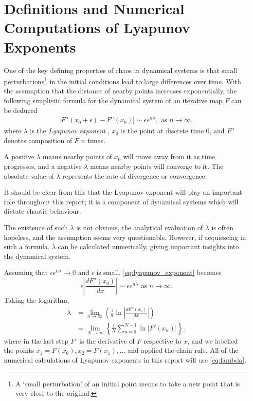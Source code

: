\section{Definitions and Numerical Computations of Lyapunov Exponents}

One of the key defining properties of chaos in dynamical systems is that small perturbations\footnote{A `small perturbation' of an initial point means to take a new point that is very close to the original.} in the initial conditions lead to large differences over time.
With the assumption that the distance of nearby points increases exponentially, the following simplistic formula for the dynamical system of an iterative map $F$ can be deduced
\begin{align}\label{eq:lyapunov_exponent}
    \left|F^n(x_0+\epsilon)-F^n(x_0)\right| \sim \epsilon e^{n \lambda}, \text{ as } n \rightarrow \infty,
\end{align}
where $\lambda$ is the \emph{Lyapunov exponent} \cite{nonlinear_system}\cite{lyapunov}, $x_0$ is the point at discrete time $0$, and $F^n$ denotes composition of $F$ $n$ times.

A positive $\lambda$ means nearby points of $x_0$ will move away from it as time progresses, and a negative $\lambda$ means nearby points will converge to it.
The absolute value of $\lambda$ represents the rate of divergence or convergence. 

It should be clear from this that the Lyapunov exponent will play an important role throughout this report; it is a component of dynamical systems which will dictate chaotic behaviour.

The existence of such $\lambda$ is not obvious, the analytical evaluation of $\lambda$ is often hopeless, and the assumption seems very questionable.
However, if acquiescing in such a formula, $\lambda$ can be calculated numerically, giving important insights into the dynamical system. 

Assuming that $\epsilon e^{n \lambda} \to 0$ and $\epsilon$ is small, \eqref{eq:lyapunov_exponent} becomes
$$
\epsilon \left| \frac{dF^n(x_0)}{dx} \right| \sim \epsilon e^{n \lambda} \text{ as } n \rightarrow \infty.
$$
Taking the logarithm,
\begin{align}
    \lambda 
    &= \lim_{n \to \infty}\left(\frac{1}{n}\ln{\left|\frac{dF^n(x_0)}{dx}\right|}\right)  \\
    &= \lim_{N \to \infty}\left\{\frac{1}{N}\sum_{n=0}^{N-1}\ln{|F'(x_n)|}\right\}  \label{eq:lambda},
\end{align}
where in the last step $F'$ is the derivative of $F$ respective to $x$, and we labelled the points $x_1 = F(x_0), x_2 = F(x_1), \dots$ and applied the chain rule.
All of the numerical calculations of Lyapunov exponents in this report will use \eqref{eq:lambda}.

